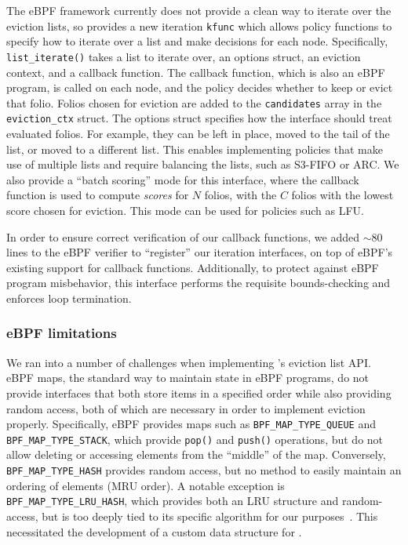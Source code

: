 The eBPF framework currently does not provide a clean way to iterate over the eviction lists, so \name provides a new iteration \texttt{kfunc} which allows policy functions to specify how to iterate over a list and make decisions for each node. Specifically, \texttt{list\_iterate()} takes a list to iterate over, an options struct, an eviction context, and a callback function. The callback function, which is also an eBPF program, is called on each node, and the policy decides whether to keep or evict that folio. Folios chosen for eviction are added to the \texttt{candidates} array in the \texttt{eviction\_ctx} struct. The options struct specifies how the interface should treat evaluated folios. For example, they can be left in place, moved to the tail of the list, or moved to a different list. This enables implementing policies that make use of multiple lists and require balancing the lists, such as S3-FIFO or ARC. We also provide a ``batch scoring'' mode for this interface, where the callback function is used to compute \emph{scores} for $N$ folios, with the $C$ folios with the lowest score chosen for eviction. This mode can be used for policies such as LFU.

In order to ensure correct verification of our callback functions, we added $\sim$80 lines to the eBPF verifier to ``register'' our iteration interfaces, on top of eBPF's existing support for callback functions. Additionally, to protect against eBPF program misbehavior, this interface performs the requisite bounds-checking and enforces loop termination.


\subsubsection{eBPF limitations}
\label{subsubsec:ebpf-limitations}

We ran into a number of challenges when implementing \name's eviction list API. eBPF maps, the standard way to maintain state in eBPF programs, do not provide interfaces that both store items in a specified order while also providing random access, both of which are necessary in order to implement eviction properly. Specifically, eBPF provides maps such as \texttt{BPF\_MAP\_TYPE\_QUEUE} and \texttt{BPF\_MAP\_TYPE\_STACK}, which provide \texttt{pop()} and \texttt{push()} operations, but do not allow deleting or accessing elements from the ``middle'' of the map. Conversely, \texttt{BPF\_MAP\_TYPE\_HASH} provides random access, but no method to easily maintain an ordering of elements (\eg MRU order). A notable exception is \texttt{BPF\_MAP\_TYPE\_LRU\_HASH}, which provides both an LRU structure and random-access, but is too deeply tied to its specific algorithm for our purposes~\cite{bpf_map_type_hash}. This necessitated the development of a custom data structure for \name.

